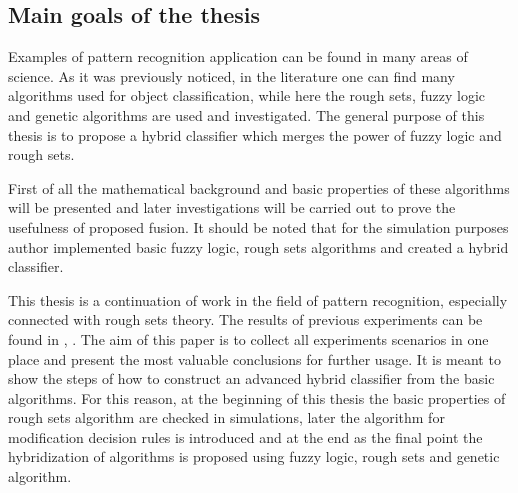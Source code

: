 \subsection{Main goals of the  thesis}
Examples of pattern recognition application can be found in many areas of
science. As it was previously noticed, in the literature one can find many algorithms 
used for object classification, while here the rough sets, fuzzy logic and genetic algorithms are used 
and investigated. The general purpose of this thesis is to propose a hybrid
classifier which merges the power of fuzzy logic and rough sets.

First of all the mathematical background and basic properties of these algorithms 
will be presented and later investigations will be carried out to prove 
the usefulness of proposed fusion. It should be noted that for the simulation purposes author
implemented basic fuzzy logic, rough sets algorithms and created a hybrid
classifier.

This thesis is a continuation of work in the field of pattern recognition,
especially connected with rough sets theory. The results of previous experiments can 
be found in \cite{bib34}, \cite{bib35}. 
The aim of this paper is to collect all experiments scenarios in one place and
present the most valuable conclusions for further usage. It is meant to show
the steps of how to construct an advanced hybrid
classifier from the basic algorithms. For this reason, at the beginning of this
thesis the basic properties of rough sets algorithm are checked in simulations, later the algorithm for 
modification decision rules is introduced and at the end as the final point
the hybridization of algorithms is proposed using fuzzy logic, rough sets and
genetic algorithm.

